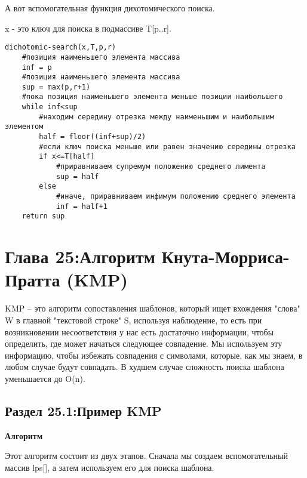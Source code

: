 А вот вспомогательная функция дихотомического поиска.

\vspace{\baselineskip}

x - это ключ для поиска в подмассиве T[p..r].

\begin{tcolorbox}
\begin{verbatim}
dichotomic-search(x,T,p,r)
    #позиция наименьшего элемента массива
    inf = p
    #позиция наименьшего элемента массива
    sup = max(p,r+1)
    #пока позиция наименьшего элемента меньше позиции наибольшего
    while inf<sup
        #находим середину отрезка между наименьшим и наибольшим элементом
        half = floor((inf+sup)/2)
        #если ключ поиска меньше или равен значению середины отрезка 
        if x<=T[half] 
            #приравниваем супремум положению среднего лимента
            sup = half
        else
            #иначе, приравниваем инфимум положению среднего элемента
            inf = half+1
    return sup
\end{verbatim}
\end{tcolorbox}

\chapter*{Глава 25:Алгоритм Кнута-Морриса-Пратта (KMP)}

KMP -- это алгоритм сопоставления шаблонов, который ищет вхождения "слова" W в главной "текстовой строке" S, используя наблюдение, то есть при возникновении несоответствия у нас есть достаточно информации, чтобы определить, где может начаться следующее совпадение. Мы используем эту информацию, чтобы избежать совпадения с символами, которые, как мы знаем, в любом случае будут совпадать. В худшем случае сложность поиска шаблона уменьшается до O(n).

\section*{Раздел 25.1:Пример KMP}

\textbf{Алгоритм}

\vspace{\baselineskip}

Этот алгоритм состоит из двух этапов. Сначала мы создаем вспомогательный массив lps[], а затем используем его для поиска шаблона.

\vspace{\baselineskip}

